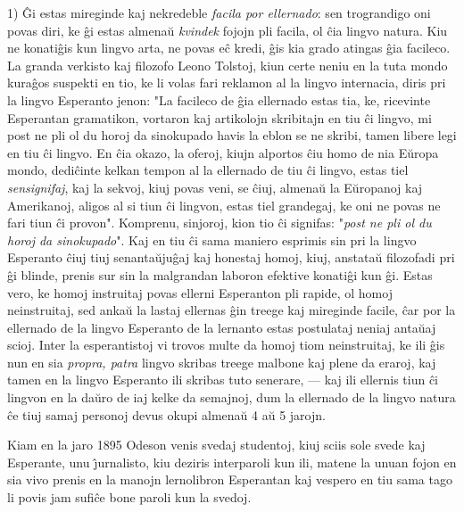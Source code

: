    1) \^Gi estas mireginde kaj nekredeble {\sl facila por ellernado}: sen
trograndigo oni povas diri, ke \^gi estas almena\u u {\sl kvindek}
fojojn pli facila, ol \^cia lingvo natura. Kiu ne konati\^gis kun
lingvo arta, ne povas e\^c kredi, \^gis kia grado atingas \^gia
facileco. La granda verkisto kaj filozofo Leono Tolstoj, kiun certe
neniu en la tuta mondo kura\^gos suspekti en tio, ke li volas fari
reklamon al la lingvo internacia, diris pri la lingvo Esperanto
jenon: "La facileco de \^gia ellernado estas tia, ke, ricevinte
Esperantan gramatikon, vortaron kaj artikolojn skribitajn en tiu
\^ci lingvo, mi post ne pli ol du horoj da sinokupado havis la eblon
se ne skribi, tamen libere legi en tiu \^ci lingvo. En \^cia okazo,
la oferoj, kiujn alportos \^ciu homo de nia E\u uropa mondo,
dedi\^cinte kelkan tempon al la ellernado de tiu \^ci lingvo, estas
tiel {\sl sensignifaj}, kaj la sekvoj, kiuj povas veni, se \^ciuj,
almena\u u la E\u uropanoj kaj Amerikanoj, aligos al si tiun \^ci
lingvon, estas tiel grandegaj, ke oni ne povas ne fari tiun \^ci
provon". Komprenu, sinjoroj, kion tio \^ci signifas: "{\sl post ne
pli ol du horoj da sinokupado}". Kaj en tiu \^ci sama maniero
esprimis sin pri la lingvo Esperanto \^ciuj tiuj senanta\u uju\^gaj
kaj honestaj homoj, kiuj, anstata\u u filozofadi pri \^gi blinde,
prenis sur sin la malgrandan laboron efektive konati\^gi kun \^gi.
Estas vero, ke homoj instruitaj povas ellerni Esperanton pli rapide,
ol homoj neinstruitaj, sed anka\u u la lastaj ellernas \^gin treege
kaj mireginde facile, \^car por la ellernado de la lingvo Esperanto
de la lernanto estas postulataj neniaj anta\u uaj scioj. Inter la
esperantistoj vi trovos multe da homoj tiom neinstruitaj, ke ili
\^gis nun en sia {\sl propra, patra} lingvo skribas treege malbone
kaj plene da eraroj, kaj tamen en la lingvo Esperanto ili skribas
tuto senerare, --- kaj ili ellernis tiun \^ci lingvon en la da\u uro
de iaj kelke da semajnoj, dum la ellernado de la lingvo natura \^ce
tiuj samaj personoj devus okupi almena\u u 4 a\u u 5 jarojn.

   Kiam en la jaro 1895 Odeson venis svedaj studentoj, kiuj sciis sole
svede kaj Esperante, unu \^{\j}urnalisto, kiu deziris interparoli
kun ili, matene la unuan fojon en sia vivo prenis en la manojn
lernolibron Esperantan kaj vespero en tiu sama tago li povis jam
sufi\^ce bone paroli kun la svedoj.

